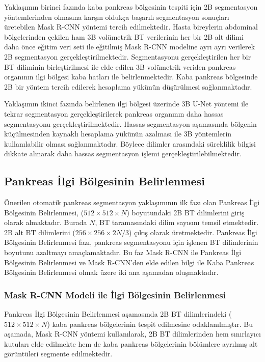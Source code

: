 Yaklaşımın birinci fazında kaba pankreas bölgesinin tespiti için 2B segmentasyon yöntemlerinden olmasına karşın oldukça başarılı segmentasyon sonuçları üretebilen Mask R-CNN yöntemi tercih edilmektedir. Hasta bireylerin abdominal bölgelerinden çekilen ham 3B volümetrik BT verilerinin her bir 2B alt dilimi daha önce eğitim veri seti ile eğitilmiş Mask R-CNN modeline ayrı ayrı verilerek 2B segmentasyon gerçekleştirilmektedir. Segmentasyonu gerçekleştirilen her bir BT diliminin birleştirilmesi ile elde edilen 3B volümetrik veriden pankreas organının ilgi bölgesi kaba hatları ile belirlenmektedir. Kaba pankreas bölgesinde 2B bir yöntem tercih edilerek hesaplama yükünün düşürülmesi sağlanmaktadır.

Yaklaşımın ikinci fazında belirlenen ilgi bölgesi üzerinde 3B U-Net yöntemi ile tekrar segmentasyon gerçekleştirilerek pankreas organının daha hassas segmentasyonu gerçekleştirilmektedir. Hassas segmentasyon aşamasında bölgenin küçülmesinden kaynaklı hesaplama yükünün azalması ile 3B yöntemlerin kullanılabilir olması sağlanmaktadır. Böylece dilimler arasındaki süreklilik bilgisi dikkate alınarak daha hassas segmentasyon işlemi gerçekleştirilebilmektedir.

\subsection{Pankreas İlgi Bölgesinin Belirlenmesi}
Önerilen otomatik pankreas segmentasyon yaklaşımının ilk fazı olan Pankreas İlgi Bölgesinin Belirlenmesi, ($512 \times 512 \times N$) boyutundaki 2B BT dilimlerini giriş olarak almaktadır. Burada $N$, BT taramasındaki dilim sayısını temsil etmektedir. 2B alt BT dilimlerini ($256 \times 256 \times 2N / 3$) çıkış olarak üretmektedir. Pankreas İlgi Bölgesinin Belirlenmesi fazı, pankreas segmentasyonu için işlenen BT dilimlerinin boyutunu azaltmayı amaçlamaktadır. Bu faz Mask R-CNN ile Pankreas İlgi Bölgesinin Belirlenmesi ve Mask R-CNN'den elde edilen bilgi ile Kaba Pankreas Bölgesinin Belirlenmesi olmak üzere iki ana aşamadan oluşmaktadır.
 
\subsubsection{Mask R-CNN Modeli ile İlgi Bölgesinin Belirlenmesi}
Pankreas İlgi Bölgesinin Belirlenmesi aşamasında 2B BT dilimlerindeki ($512 \times 512 \times N$) kaba pankreas bölgelerinin tespit edilmesine odaklanılmıştır. Bu aşamada, Mask R-CNN yöntemi kullanılarak, 2B BT dilimlerinden hem sınırlayıcı kutuları elde edilmekte hem de kaba pankreas bölgelerinin bölümlere ayrılmış alt görüntüleri segmente edilmektedir.


